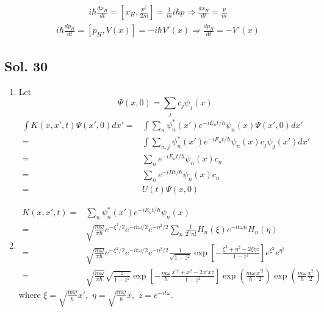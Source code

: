 \begin{align*}
    i\hbar\frac{dx_H}{dt} = [x_H, \frac{p^2}{2m}] = \frac{1}{m}i\hbar p \Rightarrow 
    \frac{dx_H}{dt}= \frac{p}{m}
\end{align*}
\begin{align*}
    i\hbar\frac{dp_H}{dt} = [p_H, V(x)] = -i\hbar V'(x) \Rightarrow 
    \frac{dp_H}{dt}= -V'(x)
\end{align*}

\subsection*{Sol. 30}
\begin{enumerate}
    \item Let $$
    \Psi(x,0) = \sum_{j}c_j\psi_j(x)
    $$
    \begin{align*}
        \int K(x,x',t)\Psi(x',0)dx' =& 
        \int \sum_n\psi_n^*(x')e^{-iE_nt/\hbar}\psi_n(x)\Psi(x',0)dx'\\
        =&
        \int \sum_{n,j}\psi_n^*(x')e^{-iE_nt/\hbar}\psi_n(x)c_j\psi_j(x')dx'\\
        =& \sum_ne^{-iE_nt/\hbar}\psi_n(x)c_n\\
        =& \sum_ne^{-iHt/\hbar}\psi_n(x)c_n\\
        =& U(t)\Psi(x,0)
    \end{align*}
    \item 
    \begin{align*}
        K(x,x',t) =& \sum_n\psi_n^*(x')e^{-iE_nt/\hbar}\psi_n(x)\\
        =&
        \sqrt{\frac{m\omega}{\pi\hbar}}e^{-\xi^2/2}
        e^{-it\omega/2}e^{-\eta^2/2}\sum_n \frac{1}{2^nn!}
        H_n(\xi)e^{-it\omega n} H_n(\eta)\\
        =&\sqrt{\frac{m\omega}{\pi\hbar}}e^{-\xi^2/2}
        e^{-it\omega/2}e^{-\eta^2/2}
        \frac{1}{\sqrt{1-z^2}}
        \exp\left[
        -\frac{\xi^2+\eta^2-2\xi\eta z}{1-z^2}
        \right]
        e^{\xi^2}e^{\eta^2}\\
        =&
        \sqrt{\frac{m\omega}{\pi\hbar}}
        \sqrt{\frac{z}{1-z^2}}
        \exp\left[
        -\frac{m\omega}{\hbar}
        \frac{x^{'2}+x^2-2x'xz}{1-z^2}
        \right]
        \exp\left(
        \frac{m\omega}{\hbar}
        \frac{x^{'2}}{2}
        \right)
        \exp\left(
        \frac{m\omega}{\hbar}
        \frac{x^{2}}{2}
        \right)
    \end{align*}
    where $\xi = \sqrt{\frac{m\omega}{\hbar}}x',$ $\eta = \sqrt{\frac{m\omega}{\hbar}}x,$ $z=e^{-it\omega}.$


\end{enumerate}

